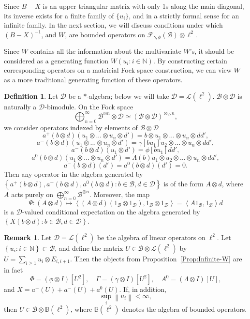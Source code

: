 \documentclass[12pt]{amsart}
\theoremstyle{definition}
\newtheorem{Defn}[Thm]{Definition}
\newtheorem{Remark}[Thm]{Remark}
\newcommand{\set}[1]{\left\{#1\right\}}
\newcommand{\mf}[1]{\mathbb{#1}}
\newcommand{\mc}[1]{\mathcal{#1}}
\newcommand{\ip}[2]{\left \langle{#1},{#2} \right \rangle}
\newcommand{\norm}[1]{\left \|{#1} \right \|}
\begin{document}
Since $B-X$ is an upper-triangular matrix with only 1s along the main diagonal, its inverse exists for a finite family of $\{u_i\}$, and in a strictly formal sense for an infinite family. In the next section, we will discuss conditions under which $(B-X)^{-1}$, and $W$, are bounded operators on $\mc{F}_{\gamma, \phi}(\mc{B})\otimes \ell^2$.

Since $W$ contains all the information about the multivariate $W$'s, it should be considered as a generating function $W(u_i : i \in \mf{N})$. By constructing certain corresponding operators on a matricial Fock space construction, we can view $W$ as a more traditional generating function of these operators.

\begin{Defn}\label{Defn:BtensorDspace}
Let $\mc{D}$ be a $\ast$-algebra; below we will take $\mc{D} = \mc{L}(\ell^2)$. $\mc{B} \otimes \mc{D}$ is naturally a $\mc{D}$-bimodule. On the Fock space
\[
\bigoplus_{n=0}^\infty \mc{B}^{\otimes n} \otimes \mc{D} \simeq (\mc{B} \otimes \mc{D})^{\otimes_{\mc{D}} n},
\]
we consider operators indexed by elements of $\mc{B} \otimes \mc{D}$
\[
a^+(b \otimes d) (u_1 \otimes \ldots \otimes u_n \otimes d') = b \otimes u_1 \otimes \ldots \otimes u_n \otimes d d',
\]
\[
a^-(b \otimes d) (u_1 \otimes \ldots \otimes u_n \otimes d') = \gamma[b u_1] u_2 \otimes \ldots \otimes u_n \otimes d d',
\]
\[
a^-(b \otimes d) (u_1 \otimes d') = \phi[b u_1] d d',
\]
\[
a^0(b \otimes d) (u_1 \otimes \ldots \otimes u_n \otimes d') = \Lambda(b) u_1 \otimes  u_2 \otimes \ldots \otimes u_n \otimes d d',
\]
\[
a^-(b \otimes d) (d') = a^0(b \otimes d)(d') = 0.
\]
Then any operator in the algebra generated by $\set{a^+(b \otimes d), a^-(b \otimes d), a^0(b \otimes d) : b \in \mc{B}, d \in \mc{D}}$ is of the form $A \otimes d$, where $A$ acts purely on $\bigoplus_{n=0}^\infty \mc{B}^{\otimes n}$. Moreover, the map
\begin{equation}
\label{Eq:Psi}
\Psi: (A \otimes d) \mapsto \ip{(A \otimes d) (1_{\mc{B}} \otimes 1_{\mc{D}})}{1_{\mc{B}} \otimes 1_{\mc{D}}} = \ip{A 1_{\mc{B}}}{1_{\mc{B}}} d
\end{equation}
is a $\mc{D}$-valued conditional expectation on the algebra generated by $\set{X(b \otimes d) : b \in \mc{B}, d \in \mc{D}}$.
\end{Defn}

\begin{Remark}
\label{Remark:U}
Let $\mc{D} = \mc{L}(\ell^2)$ be the algebra of linear operators on $\ell^2$. Let $\set{u_i : i \in \mf{N}} \subset \mc{B}$, and define the matrix $U \in \mc{B}\otimes \mc{L}(\ell^2)$ by $U = \sum_{i\geq 1} u_i \otimes E_{i, i+1}$. Then the objects from Proposition~\ref{Prop:Infinite-W} are in fact
\[
\Phi = (\phi\otimes I)[U^2], \quad \Gamma = (\gamma \otimes I)[U^2], \quad A^0 = (\Lambda \otimes I)[U],
\]
and $X = a^+(U) + a^-(U) + a^0(U)$. If, in addition, \begin{equation}
\label{Eq:Bounded}
\sup_i \norm{u_i} < \infty,
\end{equation}
then $U \in \mc{B} \otimes \mf{B}(\ell^2)$, where $\mf{B}(\ell^2)$ denotes the algebra of bounded operators.
\end{Remark}
\end{document}
